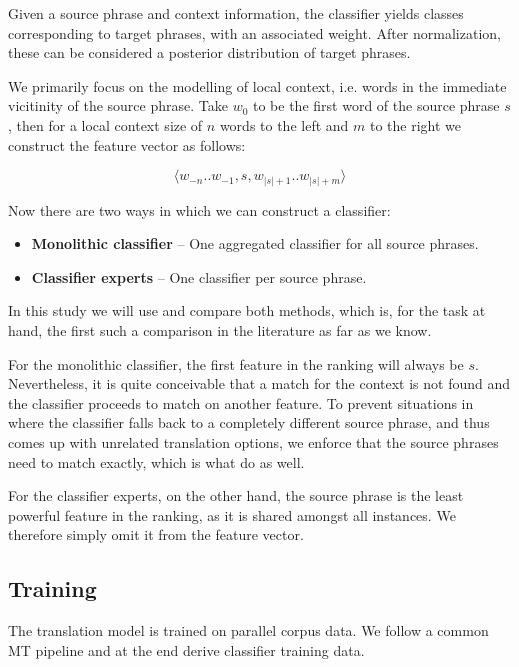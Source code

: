 \documentclass[11pt]{article}
\begin{document}
Given a source phrase and context information, the classifier yields classes
corresponding to target phrases, with an associated weight. After
normalization, these can be considered a posterior distribution of
target phrases. 

We primarily focus on the modelling of local context, i.e. words in the
immediate vicitinity of the source phrase. Take $w_0$ to be the first word of
the source phrase $s$, then for a local context size of $n$ words to the left and
$m$ to the right we construct the feature vector as follows:

\begin{equation}
  \langle w_{-n} .. w_{-1} , s , w_{|s|+1} .. w_{|s|+m} \rangle
\end{equation}

Now there are two ways in which we can construct a classifier:

\begin{itemize}
  \item \textbf{Monolithic classifier} -- One aggregated classifier for all
    source phrases.
  \item \textbf{Classifier experts} -- One classifier per source phrase.
\end{itemize}

In this study we will use and compare both methods, which is, for the task at
hand, the first such a comparison in the literature as far as we know.

For the monolithic classifier, the first feature in the ranking will always be
$s$. Nevertheless, it is quite conceivable that a match for the context is not
found and the classifier proceeds to match on another feature. To prevent
situations in where the classifier falls back to a completely different source
phrase, and thus comes up with unrelated translation options, we enforce that
the source phrases need to match exactly, which is what \cite{Stroppa+07} do as
well.

For the classifier experts, on the other hand, the source phrase is the least
powerful feature in the ranking, as it is shared amongst all instances. We
therefore simply omit it from the feature vector.

\subsection{Training}

The translation model is trained on parallel corpus data. We follow a common
MT pipeline and at the end derive classifier training data.
\end{document}
